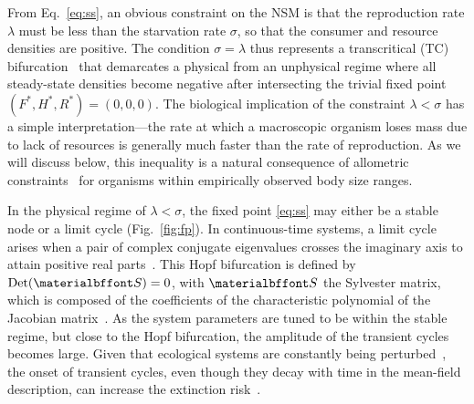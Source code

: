 \documentclass{pnastwo}
\begin{document}
\begin{article}
From Eq.~\eqref{eq:ss}, an obvious constraint on the NSM is that the reproduction rate $\lambda$ must be less than the starvation rate $\sigma$, so that the consumer and resource densities are positive.
The condition $\sigma = \lambda$ thus represents a transcritical (TC) bifurcation~\cite{Strogatz:2008wo} that demarcates a physical from an unphysical regime where all steady-state densities become negative after intersecting the trivial fixed point $(F^*,H^*,R^*)=(0,0,0)$.
The biological implication of the constraint $\lambda<\sigma$ has a simple interpretation---the rate at which a macroscopic organism loses mass due to lack of resources is generally much faster than the rate of reproduction.
As we will discuss below, this inequality is a natural consequence of allometric constraints~\cite{Kempes:2012hy} for organisms within empirically observed body size ranges. %

In the physical regime of $\lambda<\sigma$, the fixed point \eqref{eq:ss} may either be a stable node or a limit cycle (Fig.~\ref{fig:fp}).
In continuous-time systems, a limit cycle arises when a pair of complex conjugate eigenvalues crosses the imaginary axis to attain positive real parts~\cite{GuckHolmes}.
This Hopf bifurcation is defined by ${\rm Det}({\bf S}) = 0$, with $\bf S$ the Sylvester matrix, which is composed of the coefficients of the characteristic polynomial of the Jacobian matrix~\cite{Gross:2004p2428}.
As the system parameters are tuned to be within the stable regime, but close to the Hopf bifurcation, the amplitude of the transient cycles becomes large.
Given that ecological systems are constantly being perturbed~\cite{Hastings:2001jh}, the onset of transient cycles, even though they decay with time in the mean-field description, can increase the extinction risk~\cite{Neubert:1997wk,Caswell:2005eo,Neubert:2009td}.


\end{article}
\end{document}
